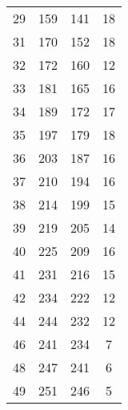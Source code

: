 \begin{table}[H]
\begin{tabular}[]{S[table-format = 2.0] S S S[table-format = 2.0]}
        29 & 159 & 141 & 18 \\
        31 & 170 & 152 & 18 \\
        32 & 172 & 160 & 12 \\
        33 & 181 & 165 & 16 \\
        34 & 189 & 172 & 17 \\
        35 & 197 & 179 & 18 \\
        36 & 203 & 187 & 16 \\
        37 & 210 & 194 & 16 \\
        38 & 214 & 199 & 15 \\
        39 & 219 & 205 & 14 \\
        40 & 225 & 209 & 16 \\
        41 & 231 & 216 & 15 \\
        42 & 234 & 222 & 12 \\
        44 & 244 & 232 & 12 \\
        46 & 241 & 234 &  7 \\
        48 & 247 & 241 &  6 \\
        49 & 251 & 246 &  5 \\
        \bottomrule
    \end{tabular}
\end{table}
